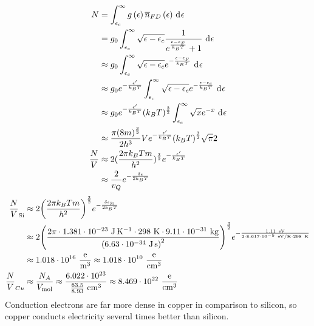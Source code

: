 \documentclass{article}
\begin{document}
\begin{equation}
    \begin{split}
        N & = \int_{\epsilon_c}^{\infty} g\left(\epsilon\right) \overline{n}_{FD}\left(\epsilon\right) \, \diff{\epsilon} \\
        & = g_0\int_{\epsilon_c}^{\infty} \sqrt{\epsilon - \epsilon_c}\frac{1}{e^{\frac{\epsilon - \epsilon_F}{k_BT}} + 1} \, \diff{\epsilon} \\
        & \approx g_0\int_{\epsilon_c}^{\infty} \sqrt{\epsilon - \epsilon_c}e^{-\frac{\epsilon - \epsilon_F}{k_BT}} \, \diff{\epsilon} \\
        & \approx g_0e^{-\frac{\epsilon'}{k_BT}}\int_{\epsilon_c}^{\infty} \sqrt{\epsilon - \epsilon_c}e^{-\frac{\epsilon - \epsilon_c}{k_BT}} \, \diff{\epsilon} \\
        & \approx g_0e^{-\frac{\epsilon'}{k_BT}}(k_BT)^{\frac{3}{2}}\int_{\epsilon_c}^{\infty} \sqrt{x}e^{-x} \, \diff{\epsilon} \\
        & \approx \frac{\pi(8m)^{\frac{3}{2}}}{2h^3}Ve^{-\frac{\epsilon'}{k_BT}}{\left(k_BT\right)}^{\frac{3}{2}}\sqrt{\pi}{2} \\
        \frac{N}{V} & \approx 2(\frac{2\pi k_BTm}{h^2})^{\frac{3}{2}}e^{-\frac{\epsilon'}{k_BT}} \\
        & \approx \frac{2}{v_Q}e^{-\frac{\delta\epsilon}{2k_BT}}
    \end{split}
\end{equation}
\begin{equation}
    \begin{split}
        \frac{N}{V}_{\ce{Si}} & \approx 2{\left(\frac{2\pi k_BTm}{h^2}\right)}^{\frac{3}{2}}e^{-\frac{\delta\epsilon_{\ce{Si}}}{2k_BT}} \\
        & \approx 2{\left(\frac{2\pi \cdot 1.381 \cdot 10^{-23}~\unit{\joule\per\kelvin} \cdot 298~\unit{\kelvin} \cdot 9.11 \cdot 10^{-31}~\unit{\kilo\gram}}{{\left(6.63 \cdot 10^{-34}~\unit{\joule\second}\right)}^2}\right)}^{\frac{3}{2}}e^{-\frac{1.11~\unit{eV}}{2\cdot 8.617 \cdot 10^{-5}~\unit{eV\per\kelvin} \cdot 298~\unit{\kelvin}}} \\
        & \approx 1.018 \cdot 10^{16}~\unit{\frac{e}{\meter\cubed}}\approx 1.018 \cdot 10^{10}~\unit{\frac{e}{\centi\meter\cubed}} \\
        \frac{N}{V}_{Cu} & \approx \frac{N_A}{V_{\unit{\mol}}} \approx \frac{6.022 \cdot 10^{23}}{\frac{63.5}{8.93}~\unit{\centi\meter\cubed}} \approx 8.469 \cdot 10^{22}~\unit{\frac{e}{\centi\meter\cubed}}
    \end{split}
\end{equation}
Conduction electrons are far more dense in copper in comparison to silicon, so copper conducts electricity several times better than silicon.
\end{document}

